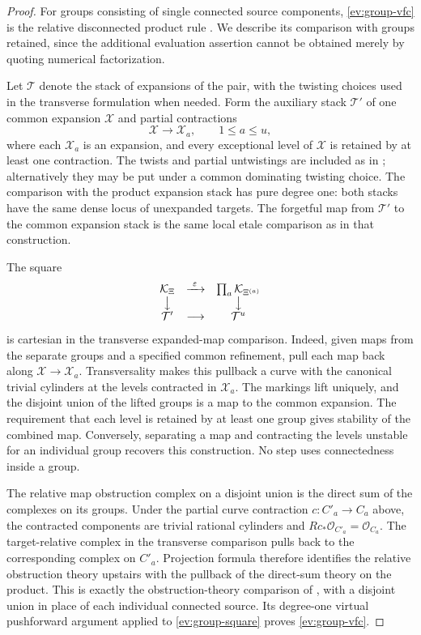 \begin{proof}
For groups consisting of single connected source components,
\eqref{ev:group-vfc} is the relative disconnected product rule
\cite[Proposition 4.14]{AF2016}.  We describe its comparison with
groups retained, since the additional evaluation assertion cannot
be obtained merely by quoting numerical factorization.

Let $\mathcal T$ denote the stack of expansions of the pair, with
the twisting choices used in the transverse formulation when
needed.  Form the auxiliary stack $\mathcal T'$ of one common
expansion $\mathcal X$ and partial contractions
\[
   \mathcal X\longrightarrow\mathcal X_a,
   \qquad 1\leq a\leq u,
\]
where each $\mathcal X_a$ is an expansion, and every exceptional
level of $\mathcal X$ is retained by at least one contraction.
The twists and partial untwistings are included as in
\cite[Sections~4.7.3--4.7.4]{AF2016}; alternatively they may be put under
a common dominating twisting choice.  The comparison with the
product expansion stack has pure degree one: both stacks have the
same dense locus of unexpanded targets.  The forgetful map from
$\mathcal T'$ to the common expansion stack is the same local
etale comparison as in that construction.

The square
\begin{equation}
\label{ev:group-square}
 \begin{matrix}
  \mathcal K_\Xi &\xrightarrow{\ \varepsilon\ }&
        \prod_a\mathcal K_{\Xi^{(a)}}\\
  \big\downarrow &&\big\downarrow\\
  \mathcal T'&\longrightarrow&\mathcal T^{u}
 \end{matrix}
\end{equation}
is cartesian in the transverse expanded-map comparison.  Indeed,
given maps from the separate groups and a specified common
refinement, pull each map back along
$\mathcal X\to\mathcal X_a$.  Transversality makes this pullback a
curve with the canonical trivial cylinders at the levels contracted
in $\mathcal X_a$.  The markings lift uniquely, and the disjoint
union of the lifted groups is a map to the common expansion.
The requirement that each level is retained by at least one group
gives stability of the combined map.  Conversely, separating a map
and contracting the levels unstable for an individual group recovers
this construction.  No step uses connectedness inside a group.

The relative map obstruction complex on a disjoint union is the
direct sum of the complexes on its groups.  Under the partial curve
contraction $c:C'_a\to C_a$ above, the contracted components are
trivial rational cylinders and
$Rc_*\mathcal O_{C'_a}=\mathcal O_{C_a}$.  The target-relative
complex in the transverse comparison pulls back to the
corresponding complex on $C'_a$.  Projection formula therefore
identifies the relative obstruction theory upstairs with the
pullback of the direct-sum theory on the product.  This is exactly
the obstruction-theory comparison of
\cite[Lemmas 4.16--4.18]{AF2016}, with a disjoint union in place
of each individual connected source.  Its degree-one virtual
pushforward argument applied to \eqref{ev:group-square} proves
\eqref{ev:group-vfc}.


\end{proof}
